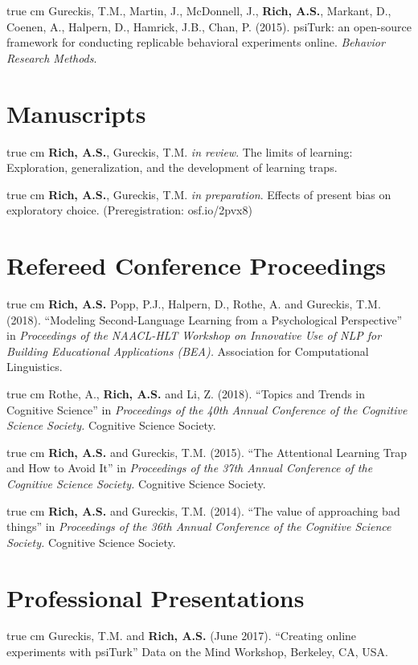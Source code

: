 \documentclass[12pt]{my_cv}
\def\ind{\hangindent=1 true cm\hangafter=1 \noindent}
\begin{document}
\ind Gureckis, T.M., Martin, J., McDonnell, J., \textbf{Rich, A.S.}, Markant,
D., Coenen, A., Halpern, D., Hamrick, J.B., Chan, P. (2015). psiTurk: an
open-source framework for conducting replicable behavioral experiments online.
\emph{Behavior Research Methods}.

\section{Manuscripts}

\ind \textbf{Rich, A.S.}, Gureckis, T.M. \emph{in review}. The limits of learning:
Exploration, generalization, and the development of learning traps.

\ind \textbf{Rich, A.S.}, Gureckis, T.M. \emph{in preparation}. Effects of
present bias on exploratory choice. (Preregistration: osf.io/2pvx8)

\section{Refereed Conference Proceedings}

\ind \textbf{Rich, A.S.} Popp, P.J., Halpern, D., Rothe, A. and Gureckis, T.M.
(2018). ``Modeling Second-Language Learning from a Psychological Perspective''
in \emph{Proceedings of the NAACL-HLT Workshop on Innovative Use of NLP for
  Building Educational Applications (BEA).} Association for Computational Linguistics.	

\ind Rothe, A., \textbf{Rich, A.S.} and Li, Z. (2018). ``Topics and Trends in Cognitive Science'' in \emph{Proceedings of the 40th Annual Conference of the Cognitive Science Society.} Cognitive Science Society.	

\ind \textbf{Rich, A.S.} and Gureckis, T.M. (2015). ``The Attentional Learning Trap and How to Avoid It'' in \emph{Proceedings of the 37th Annual Conference of the Cognitive Science Society.}  Cognitive Science Society.	

\ind \textbf{Rich, A.S.} and Gureckis, T.M. (2014). ``The value of approaching bad things'' in \emph{Proceedings of the 36th Annual Conference of the Cognitive Science Society.} Cognitive Science Society.	

\section{Professional Presentations}

\ind Gureckis, T.M. and \textbf{Rich, A.S.} (June 2017). ``Creating online
experiments with psiTurk'' Data on the Mind Workshop, Berkeley, CA, USA.
\end{document}
